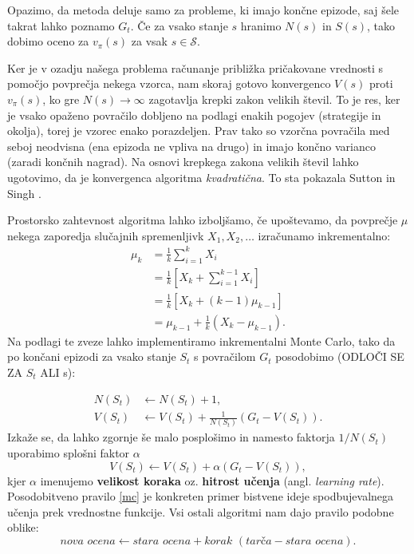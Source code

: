 \documentclass[12pt,a4paper]{amsart}
\theoremstyle{definition} %
\theoremstyle{plain} %
\begin{document}
Opazimo, da metoda deluje samo za probleme, ki imajo končne epizode, saj šele takrat lahko poznamo $G_t$. 
Če za vsako stanje $s$ hranimo $N(s)$ in $S(s)$, tako dobimo oceno za $v_\pi(s)$ za vsak $s \in 
\mathcal{S}$.

Ker je v ozadju našega problema računanje približka pričakovane vrednosti s pomočjo povprečja nekega 
vzorca, nam skoraj gotovo konvergenco $V(s)$ proti $v_\pi(s)$, ko gre $N(s) \rightarrow \infty$ 
zagotavlja krepki zakon velikih števil. To je res, ker je vsako opaženo povračilo dobljeno na podlagi 
enakih pogojev (strategije in okolja), torej je vzorec enako porazdeljen. Prav tako so vzorčna povračila 
med seboj neodvisna (ena epizoda ne vpliva na drugo) in imajo končno varianco (zaradi končnih nagrad). 
Na osnovi krepkega zakona velikih števil lahko ugotovimo, da je konvergenca algoritma \textit{kvadratična}. 
To sta pokazala Sutton in Singh \cite{MCdokaz}.

Prostorsko zahtevnost algoritma lahko izboljšamo, če upoštevamo, da povprečje $\mu$ nekega zaporedja 
slučajnih spremenljivk $X_1, X_2, \dots$ izračunamo inkrementalno:
\begin{align*}
    \mu_k &= \frac{1}{k} \sum_{i = 1}^k X_i \\
        &= \frac{1}{k} \left[X_k + \sum_{i = 1}^{k-1} X_i \right] \\
        &= \frac{1}{k} \left[X_k + (k-1) \mu_{k-1} \right] \\
        &= \mu_{k-1} + \frac{1}{k} \left(X_k - \mu_{k-1} \right).
\end{align*}
Na podlagi te zveze lahko implementiramo inkrementalni Monte Carlo, tako da po končani epizodi 
za vsako stanje $S_t$ s povračilom $G_t$ posodobimo (ODLOČI SE ZA $S_t$ ALI s): 

\begin{align*}
    N(S_t) &\leftarrow N(S_t) + 1, \\
    V(S_t) &\leftarrow V(S_t) + \frac{1}{N(S_t)} (G_t - V(S_t)).
\end{align*}
Izkaže se, da lahko zgornje še malo posplošimo in namesto faktorja $1/N(S_t)$ uporabimo splošni 
faktor $\alpha$
\begin{equation}\label{mc}
    V(S_t) \leftarrow V(S_t) + \alpha (G_t - V(S_t)),
\end{equation}
kjer $\alpha$ imenujemo \textbf{velikost koraka} oz. \textbf{hitrost učenja} (angl. 
\textit{learning rate}). Posodobitveno pravilo \eqref{mc} je konkreten primer bistvene ideje 
spodbujevalnega učenja prek vrednostne funkcije. Vsi ostali algoritmi nam dajo pravilo podobne 
oblike: 
\begin{equation}\label{osnova}
    \textit{nova ocena} \leftarrow \textit{stara ocena} + \textit{korak } 
    (\textit{tarča} - \textit{stara ocena}).
\end{equation}
\end{document}
